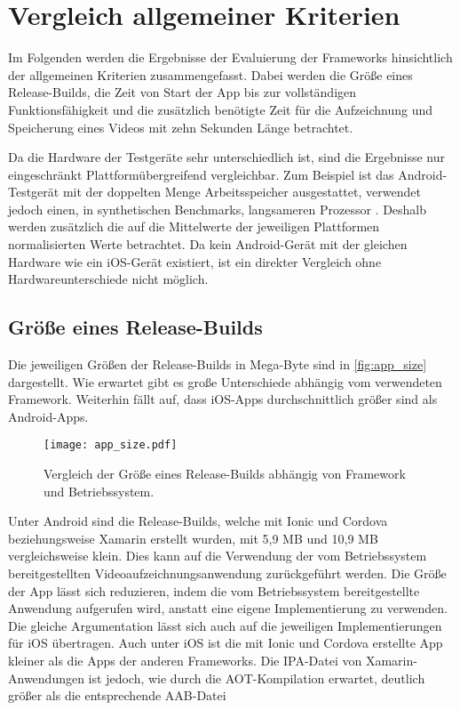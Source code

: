 \section{Vergleich allgemeiner Kriterien}
\label{sec:evaluation_allgemein}

Im Folgenden werden die Ergebnisse der Evaluierung der Frameworks hinsichtlich der allgemeinen Kriterien zusammengefasst.
Dabei werden die Größe eines Release-Builds, die Zeit von Start der App bis zur vollständigen Funktionsfähigkeit und die zusätzlich benötigte Zeit für die Aufzeichnung und Speicherung eines Videos mit zehn Sekunden Länge betrachtet.

Da die Hardware der Testgeräte sehr unterschiedlich ist, sind die Ergebnisse nur eingeschränkt Plattformübergreifend vergleichbar.
Zum Beispiel ist das Android-Testgerät mit der doppelten Menge Arbeitsspeicher ausgestattet, verwendet jedoch einen, in synthetischen Benchmarks, langsameren Prozessor \cite{Comparison_Phones}.
Deshalb werden zusätzlich die auf die Mittelwerte der jeweiligen Plattformen normalisierten Werte betrachtet.
Da kein Android-Gerät mit der gleichen Hardware wie ein iOS-Gerät existiert, ist ein direkter Vergleich ohne Hardwareunterschiede nicht möglich.


\subsection{Größe eines Release-Builds}

Die jeweiligen Größen der Release-Builds in Mega-Byte sind in \autoref{fig:app_size} dargestellt.
Wie erwartet gibt es große Unterschiede abhängig vom verwendeten Framework.
Weiterhin fällt auf, dass iOS-Apps durchschnittlich größer sind als Android-Apps.
\begin{figure}[ht]
  \centering 
  \texttt{[image: app\_size.pdf]}
  \caption{Vergleich der Größe eines Release-Builds abhängig von Framework und Betriebssystem.}
  \label{fig:app_size}
\end{figure}

Unter Android sind die Release-Builds, welche mit Ionic und Cordova beziehungsweise Xamarin erstellt wurden, mit 5,9 MB und 10,9 MB vergleichsweise klein.
Dies kann auf die Verwendung der vom Betriebssystem bereitgestellten Videoaufzeichnungsanwendung zurückgeführt werden.
Die Größe der App lässt sich reduzieren, indem die vom Betriebssystem bereitgestellte Anwendung aufgerufen wird, anstatt eine eigene Implementierung zu verwenden.
Die gleiche Argumentation lässt sich auch auf die jeweiligen Implementierungen für iOS übertragen.
Auch unter iOS ist die mit Ionic und Cordova erstellte App kleiner als die Apps der anderen Frameworks.
Die \ac{IPA}-Datei von Xamarin-Anwendungen ist jedoch, wie durch die \ac{AOT}-Kompilation erwartet, deutlich größer als die entsprechende \ac{AAB}-Datei


